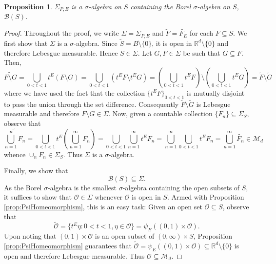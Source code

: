 \documentclass[11pt]{article}
\newtheorem{proposition}[theorem]{Proposition}
\begin{document}
\begin{proposition}\label{prop:BorelContainment}
$\Sigma_{P,E}$ is a $\sigma$-algebra on $S$ containing the Borel $\sigma$-algebra on $S$, $\mathcal{B}(S)$.
\end{proposition}

\begin{proof}
Throughout the proof, we write $\Sigma=\Sigma_{P,E}$ and $\widetilde{F}=\widetilde{F_E}$ for each $F\subseteq S$.
We first show that $\Sigma$ is a $\sigma$-algebra. Since $\widetilde S=B\setminus\{0\}$, it is open in $\mathbb{R}^d\setminus\{0\}$ and therefore Lebesgue measurable. Hence $S\in \Sigma$. Let $G, F\in \Sigma$ be such that $G\subseteq F$. Then,
\begin{equation*}
\widetilde{F\setminus G}=\bigcup_{0<t<1}t^E\left(F\setminus G\right)=\bigcup_{0<t<1}\left(t^EF\setminus t^E G\right)=\left(\bigcup_{0<t<1}t^E F\right)\setminus\left(\bigcup_{0<t<1}t^E G\right)=\widetilde F\setminus \widetilde G
\end{equation*}
where we have used the fact that the collection $\{t^E F\}_{0<t<1}$ is mutually disjoint to pass the union through the set difference. Consequently $\widetilde F\setminus \tilde{G}$ is Lebesgue measurable and therefore $F\setminus G\in \Sigma$.  Now, given a countable collection $\{F_n\}\subseteq \Sigma_S$, observe that
\begin{equation*}
    \widetilde{\bigcup_{n=1}^\infty F_n}= \bigcup_{0<t<1} t^E \left(\bigcup_{n=1}^\infty F_n\right)= \bigcup_{0 <t < 1}  \bigcup_{n=1}^\infty  t^E F_n =\bigcup_{n=1}^\infty \bigcup_{0 <t < 1}  t^E F_n =\bigcup_{n=1}^\infty \widetilde{F_n} \in \mathcal{M}_d
\end{equation*}
whence $\cup_n F_n\in \Sigma_S$. Thus $\Sigma$ is a $\sigma$-algebra. 

Finally, we show that
\begin{equation*}
\mathcal{B}(S)\subseteq\Sigma.
\end{equation*}
As the Borel $\sigma$-algebra is the smallest $\sigma$-algebra containing the open subsets of $S$, it suffices to show that $\mathcal{O}\in \Sigma$ whenever $\mathcal{O}$ is open in $S$. Armed with Proposition \ref{prop:PsiHomeomorphism}, this is an easy task: Given an open set $\mathcal{O}\subseteq S$, observe that
\begin{equation*}
\widetilde{\mathcal{O}}=\{t^E\eta:0<t<1,\eta\in\mathcal{O}\}=\psi_E((0,1)\times\mathcal{O}).
\end{equation*}
Upon noting that $(0,1)\times\mathcal{O}$ is an open subset of $(0,\infty)\times S$, Proposition \ref{prop:PsiHomeomorphism} guarantees that $\widetilde{\mathcal{O}}=\psi_E((0,1)\times\mathcal{O})\subseteq\mathbb{R}^d\setminus\{0\}$ is open and therefore Lebesgue measurable. Thus $\mathcal{O}\subseteq \mathcal{M}_d$.
\end{proof}
\end{document}

